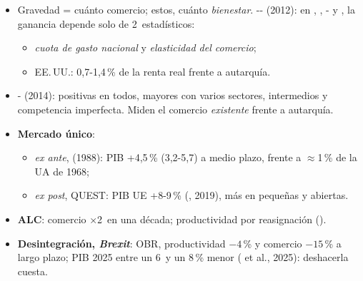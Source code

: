 \documentclass{article}
\begin{document}
\begin{columnas}
\begin{itemize}
\item Gravedad = cuánto comercio; estos, cuánto \emph{bienestar}. -- (2012): en , , - y , la ganancia depende solo de 2~estadísticos:
  \begin{itemize}
  \item \emph{cuota de gasto nacional} y \emph{elasticidad del comercio};
  \item EE.\,UU.: 0,7-1,4\,\% de la renta real frente a autarquía.
  \end{itemize}
\item {}- (2014): positivas en todos, mayores con varios sectores, intermedios y competencia imperfecta. Miden el comercio \emph{existente} frente a autarquía.
\end{itemize}

\begin{itemize}
\item \textbf{Mercado único}:
  \begin{itemize}
  \item \emph{ex ante},  (1988): PIB +4,5\,\% (3,2-5,7) a medio plazo, frente a $\approx$1\,\% de la UA de 1968;
  \item \emph{ex post}, QUEST: PIB UE +8-9\,\% (, 2019), más en pequeñas y abiertas.
  \end{itemize}
\item \textbf{ALC}: comercio ×2~en una década; productividad por reasignación ().
\item \textbf{Desintegración, \emph{Brexit}}: OBR, productividad $-4$\,\% y comercio $-15$\,\% a largo plazo; PIB 2025 entre un 6~y un 8\,\% menor ( et al., 2025): deshacerla cuesta.
\end{itemize}


\end{columnas}
\end{document}
